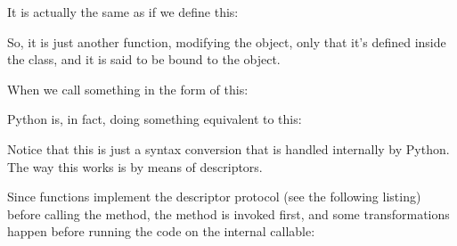 \documentclass[a4paper,10pt,english]{sphinxmanual}
\begin{document}
It is actually the same as if we define this:

\begin{sphinxVerbatim}[commandchars=\\\{\}]
 

  
      
\end{sphinxVerbatim}

So, it is just another function, modifying the object, only that it’s defined inside the class,
and it is said to be bound to the object.

When we call something in the form of this:

\begin{sphinxVerbatim}[commandchars=\\\{\}]
  
\end{sphinxVerbatim}

Python is, in fact, doing something equivalent to this:

\begin{sphinxVerbatim}[commandchars=\\\{\}]
  
 
\end{sphinxVerbatim}

Notice that this is just a syntax conversion that is handled internally by Python. The way
this works is by means of descriptors.

Since functions implement the descriptor protocol (see the following listing) before calling
the method, the  method is invoked first, and some transformations happen
before running the code on the internal callable:

\begin{sphinxVerbatim}[commandchars=\\\{\}]
  
\end{sphinxVerbatim}
\end{document}
